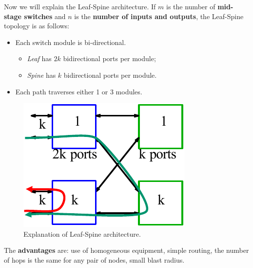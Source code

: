 \noindent
Now we will explain the Leaf-Spine architecture. If $m$ is the number of \textbf{mid-stage switches} and $n$ is the \textbf{number of inputs and outputs}, the Leaf-Spine topology is as follows:
\begin{itemize}
    \item Each switch module is bi-directional. 
    \begin{itemize}
        \item \emph{Leaf} has $2k$ bidirectional ports per module;
        \item \emph{Spine} has $k$ bidirectional ports per module.
    \end{itemize}

    \item Each path traverses either 1 or 3 modules.
\end{itemize}
\begin{figure}[!htp]
    \centering
    \includegraphics[width=.3\textwidth]{img/networking-5.pdf}
    \caption{Explanation of Leaf-Spine architecture.}
\end{figure}

\noindent
The \textbf{advantages} are: use of homogeneous equipment, simple routing, the number of hops is the same for any pair of nodes, small blast radius.


